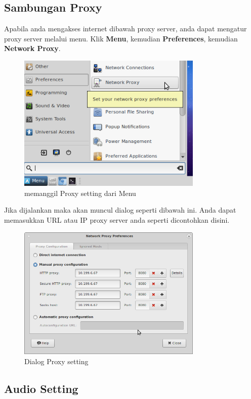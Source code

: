 \documentclass[12pt,]{article}
\begin{document}
	\newpage
	
	\subsection{Sambungan Proxy}
	
	Apabila anda mengakses internet dibawah proxy server, anda dapat mengatur proxy server melalui menu.
	Klik \textbf{Menu}, kemudian \textbf{Preferences}, kemudian \textbf{Network Proxy}. 
	
	\begin{figure}[h]
		\centering
		\includegraphics[width=250pt]{png/menuproxy}
		\caption{memanggil Proxy setting dari Menu}
	\end{figure}

	Jika dijalankan maka akan muncul dialog seperti dibawah ini.
	Anda dapat memasukkan URL atau IP proxy server anda seperti dicontohkan disini.
	
	\begin{figure}[h]
		\centering
		\includegraphics[width=250pt]{png/proxydlg}
		\caption{Dialog Proxy setting}
	\end{figure}
	
	\newpage
	
	\subsection{Audio Setting}
	
\end{document}
